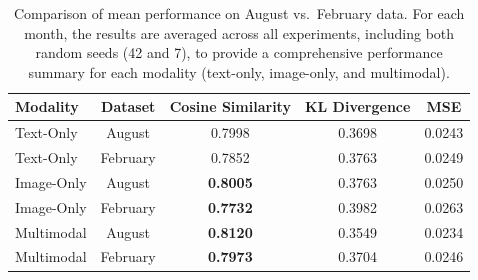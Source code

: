 \begin{table}[ht]
    \centering
    \begin{tabular}{lcccc}
    \toprule
    \textbf{Modality} & \textbf{Dataset} & \textbf{Cosine Similarity} & \textbf{KL Divergence} & \textbf{MSE} \\
    \midrule
    Text-Only & August & 0.7998 &  0.3698 & 0.0243 \\
    Text-Only & February & 0.7852 &  0.3763 & 0.0249 \\
    \midrule
    Image-Only & August & \textbf{0.8005} & 0.3763 & 0.0250 \\
    Image-Only & February & \textbf{0.7732} & 0.3982 & 0.0263 \\
    \midrule
    Multimodal & August & \textbf{0.8120} & 0.3549 & 0.0234 \\
    Multimodal & February & \textbf{0.7973} & 0.3704 & 0.0246 \\
    \bottomrule
    \end{tabular}%
    \caption{Comparison of mean performance on August vs.\ February data. 
    For each month, the results are averaged across all experiments, including both random seeds (42 and 7), to provide a comprehensive performance summary for each modality (text-only, image-only, and multimodal).}

    \label{tab:dataset_comparison}
\end{table}


